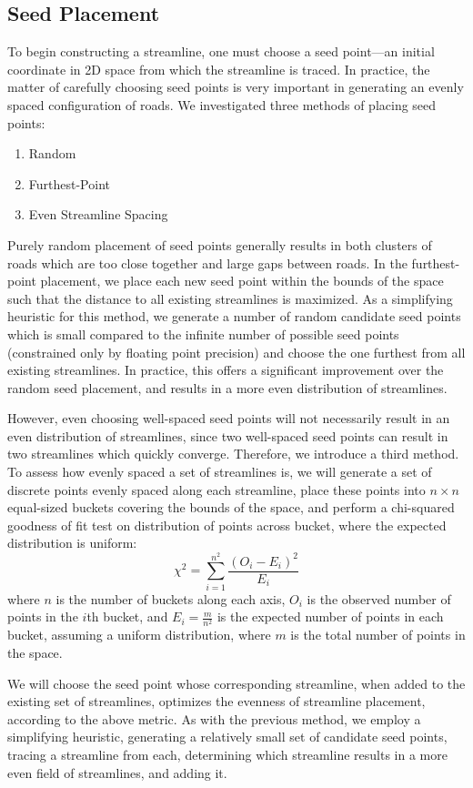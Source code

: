 \documentclass[twocolumn]{article}
\begin{document}
\subsection{Seed Placement}\label{seedpoints}
To begin constructing a streamline, one must choose a seed point—an initial
coordinate in 2D space from which the streamline is traced. In practice, the
matter of carefully choosing seed points is very important in generating an
evenly spaced configuration of roads. We investigated three methods of placing
seed points:
\begin{enumerate}
    \item Random
    \item Furthest-Point
    \item Even Streamline Spacing
\end{enumerate}
Purely random placement of seed points generally results in both clusters of
roads which are too close together and large gaps between roads. In the
furthest-point placement, we place each new seed point within the bounds of the
space such that the distance to all existing streamlines is maximized. As a
simplifying heuristic for this method, we generate a number of random candidate
seed points which is small compared to the infinite number of possible seed
points (constrained only by floating point precision) and choose the one
furthest from all existing streamlines. In practice, this offers a significant
improvement over the random seed placement, and results in a more even
distribution of streamlines.

However, even choosing well-spaced seed points will not necessarily result in
an even distribution of streamlines, since two well-spaced seed points can
result in two streamlines which quickly converge. Therefore, we introduce a
third method. To assess how evenly spaced a set of streamlines is, we will
generate a set of discrete points evenly spaced along each streamline, place
these points into $n\times n$ equal-sized buckets covering the bounds of the
space, and perform a chi-squared goodness of fit test on distribution of points
across bucket, where the expected distribution is uniform:
\[
    \chi^2 = \sum_{i=1}^{n^2} \frac{(O_i-E_i)^2}{E_i}
\]
where $n$ is the number of buckets along each axis, $O_i$ is the observed
number of points in the $i$th bucket, and $E_i=\frac{m}{n^2}$ is the
expected number of points in each bucket, assuming a uniform distribution,
where $m$ is the total number of points in the space.

We will choose the seed point whose corresponding streamline, when added to the
existing set of streamlines, optimizes the evenness of streamline placement,
according to the above metric. As with the previous method, we employ a
simplifying heuristic, generating a relatively small set of candidate seed
points, tracing a streamline from each, determining which streamline results in
a more even field of streamlines, and adding it.
\end{document}

